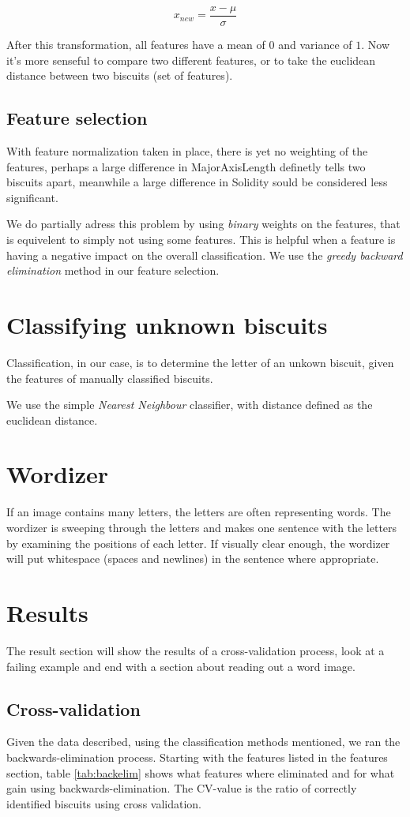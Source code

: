 \documentclass[a4paper,11pt]{article}
\begin{document}
\begin{equation}
x_{new} = \frac{x - \mu}{\sigma}
\label{eqn:univariance}
\end{equation}

After this transformation, all features have a mean of $0$ and variance of $1$.
Now it's more senseful to compare two different features, or to take the euclidean distance between two biscuits (set of features).
\subsection{Feature selection}
With feature normalization taken in place, there is yet no weighting of the features,
perhaps a large difference in MajorAxisLength definetly tells two biscuits apart,
meanwhile a large difference in Solidity sould be considered less significant.

We do partially adress this problem by using \emph{binary} weights on the features, 
that is equivelent to simply not using some features.
This is helpful when a feature is having a negative impact on the overall classification.
We use the \emph{greedy backward elimination} method in our feature selection.
\section{Classifying unknown biscuits}
Classification, in our case, is to determine the letter of an unkown biscuit, given the features of manually classified biscuits.

We use the simple \emph{Nearest Neighbour} classifier, with distance defined as the euclidean distance.

\section{Wordizer}
If an image contains many letters, the letters are often representing words.
The wordizer is sweeping through the letters and makes one sentence with the letters by examining the positions of each letter.
If visually clear enough, the wordizer will put whitespace (spaces and newlines) in the sentence where appropriate.
\section{Results}
The result section will show the results of a cross-validation process, look at a failing example and end with a section about reading out a word image.
\subsection{Cross-validation}
Given the data described, using the classification methods mentioned, we ran the backwards-elimination process.
Starting with the features listed in the features section, table \ref{tab:backelim} shows what features
where eliminated and for what gain using backwards-elimination.
The CV-value is the ratio of correctly identified biscuits using cross validation.
\end{document}
